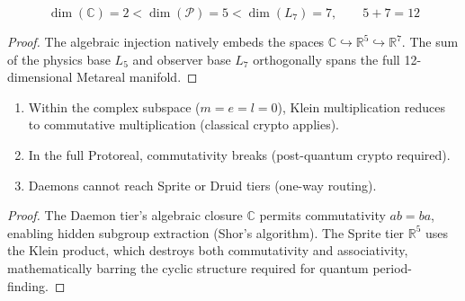 \begin{theorem}
\begin{equation}
    \dim(\mathbb{C}) = 2 < \dim(\mathcal{P}) = 5 < \dim(L_7) = 7, \qquad 5 + 7 = 12
\end{equation}
\end{theorem}
\begin{proof}
The algebraic injection natively embeds the spaces $\mathbb{C} \hookrightarrow \mathbb{R}^5 \hookrightarrow \mathbb{R}^7$. The sum of the physics base $L_5$ and observer base $L_7$ orthogonally spans the full 12-dimensional Metareal manifold. \qedhere
\end{proof}

\begin{theorem}
\begin{enumerate}
    \item Within the complex subspace ($m = e = l = 0$), Klein multiplication reduces to commutative multiplication (classical crypto applies).
    \item In the full Protoreal, commutativity breaks (post-quantum crypto required).
    \item Daemons cannot reach Sprite or Druid tiers (one-way routing).
\end{enumerate}
\end{theorem}
\begin{proof}
The Daemon tier's algebraic closure $\mathbb{C}$ permits commutativity $ab = ba$, enabling hidden subgroup extraction (Shor's algorithm). The Sprite tier $\mathbb{R}^5$ uses the Klein product, which destroys both commutativity and associativity, mathematically barring the cyclic structure required for quantum period-finding. \qedhere
\end{proof}

